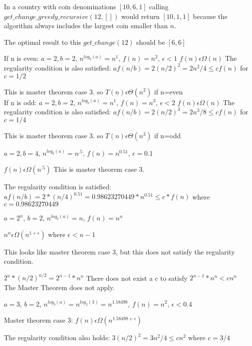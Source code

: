 \documentclass[12pt]{article}
\newenvironment{question}[2][Question]{\begin{trivlist}
		\item[\hskip \labelsep {\bfseries #1}\hskip \labelsep {\bfseries #2.}]}{\end{trivlist}}
\begin{document}
	\begin{question}{1c}
		 In a country with coin denominations $[10,6,1]$ calling $get\_change\_greedy\_recursive(12, [])$ would return $[10, 1, 1]$ because the algorithm always includes the largest coin smaller than $n$.
		 
		 The optimal result to this $get\_change(12)$ should be $[6,6]$
	\end{question}
	
	
\begin{question}{2a}
	If n is even: $a=2, b=2$, $n^{log_b(a)}= n^1$, $f(n)=n^2$, $\epsilon < 1 $
	$f(n) \epsilon \Omega(n)$ The regularity condition is also satisfied:
	$af(n/b)=2 (n/2)^2 = 2n^2/4 \leq cf(n)$ for $c=1/2$
	
	This is master theorem case 3. 
	so $T(n) \epsilon \Theta(n^2)$ if n=even\\
	
	If n is odd: $a=2, b=2$, $n^{log_b(a)}= n^1$, $f(n)=n^3$, $\epsilon < 2 $
	$f(n) \epsilon \Omega(n)$ The regularity condition is also satisfied:
	$af(n/b)=2 (n/2)^3 = 2n^3/8 \leq cf(n)$ for $c=1/4$
		
	This is master theorem case 3. 
	so $T(n) \epsilon \Theta(n^3)$ if n=odd\\
\end{question}

\begin{question}{2b}
	$a=2, b=4$, $n^{log_b(a)} = n^.5$, $f(n)=n^{0.51}$, $\epsilon =0.1 $
	
	$f(n) \epsilon \Omega(n^.5)$
	This is master theorem case 3. 
	
	The regularity condition is satisfied: 
	$af(n/b) = 2*(n/4)^0.51 = 0.98623270449 * n^0.51 \leq c*f(n)$ where $c=0.98623270449$
\end{question}

\begin{question}{2c}
	$a=2^n$, $b=2$, $n^{log_b(a)}=n$, $f(n)=n^n$
	
	$n^n \epsilon \Omega(n^{1+\epsilon})$ where $\epsilon<n-1$
	
	This looks like master theorem case 3, but this does not satisfy the regularity condition.
	
	$2^n * (n/2)^{n/2} = 2^{n-1}*n^n$ There does not exist a c to satisfy $2^{n-1}*n^n<cn^n$
	The Master Theorem does not apply.
\end{question}
	
\begin{question}{2d}
	$a=3$, $b=2$, $n^{log_b(a)}=n^{log_2(3)}=n^1.58498$, $f(n)=n^2$, $\epsilon<0.4$
	
	Master theorem case 3: $f(n) \epsilon \Omega(n^{1.58498+\epsilon})$
	
	The regularity condition also holds: $3(n/2)^2= 3n^2/4 \leq cn^2$ where $c=3/4$
	
\end{question}
\end{document}
